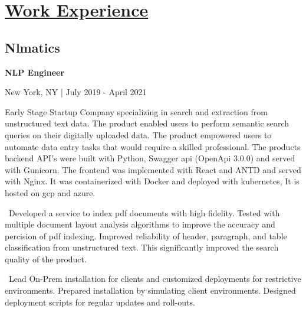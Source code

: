 \documentclass{article}
\begin{document}
\begin{minipage}[t][0pt]{8in\linewidth}
\begin{minipage}[t]{0.45\textwidth\hspace{0in}}
    \section{\underline{Work Experience}}
        \vspace{-0.8em}
        \subsection{Nlmatics}
        \vspace{-0.5em}\hspace{0.1em}
        \mdseries\bfseries{NLP Engineer}
        \vspace{0.1em}
        
        \hspace{0.5em}\mdseries\textrm{New York, NY | July 2019 - April 2021}

        \vspace{-0.8em}
        \begin{minipage}[t]{3.75in\textwidth\hspace{0in}}
            
            \vspace{0.3em}
            {Early Stage Startup Company specializing in search and extraction from unstructured text data. The product enabled users to perform semantic search queries on their digitally uploaded data. The product empowered users to automate data entry tasks that would require a skilled professional. The products backend API's were built with Python, Swagger api (OpenApi 3.0.0) and served with Gunicorn. The frontend was implemented with React and ANTD and served with Nginx. It was containerized with Docker and deployed with kubernetes, It is hosted on gcp and azure.}

            \vspace{0.3em}
            \hspace{1em}\textasteriskcentered \, \mdseries\textrm{Developed a service to index pdf documents with high fidelity. Tested with multiple document layout analysis algorithms to improve the accuracy and percision of pdf indexing. Improved reliability of header, paragraph, and table classification from unstructured text. This significantly improved the search quality of the product.}
            
            \vspace{0.3em}
            \hspace{1em}\textasteriskcentered \, \mdseries\textrm{Lead On-Prem installation for clients and customized deployments for restrictive environments. Prepared installation by simulating client environments. Designed deployment scripts for regular updates and roll-outs.}


\end{minipage}
\end{minipage}
\end{minipage}
\end{document}
